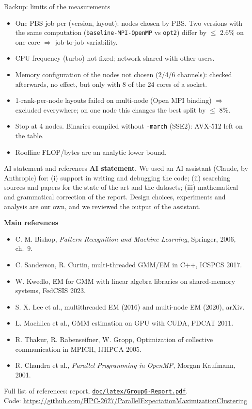 \documentclass[aspectratio=169,10pt]{beamer}
\newcommand{\vbase}{\texttt{baseline-MPI-OpenMP}}
\newcommand{\opttwo}{\texttt{opt2}}
\begin{document}
\begin{frame}{Backup: limits of the measurements}
\small
\begin{itemize}
\item One PBS job per (version, layout): nodes chosen by PBS. Two versions with the same computation (\vbase{} vs \opttwo{}) differ by $\le$ 2.6\% on one core $\Rightarrow$ job-to-job variability.
\item CPU frequency (turbo) not fixed; network shared with other users.
\item Memory configuration of the nodes not chosen (2/4/6 channels): checked afterwards, no effect, but only with 8 of the 24 cores of a socket.
\item 1-rank-per-node layouts failed on multi-node (Open MPI binding) $\Rightarrow$ excluded everywhere; on one node this changes the best split by $\le$ 8\%.
\item Stop at 4 nodes. Binaries compiled without \texttt{-march} (SSE2): AVX-512 left on the table.
\item Roofline FLOP/bytes are an analytic lower bound.
\end{itemize}
\end{frame}

\begin{frame}{AI statement and references}
\scriptsize
\textbf{AI statement.} We used an AI assistant (Claude, by Anthropic) for: (i) support in writing and debugging the code; (ii) searching sources and papers for the state of the art and the datasets; (iii) mathematical and grammatical correction of the report. Design choices, experiments and analysis are our own, and we reviewed the output of the assistant.

\medskip
\textbf{Main references}
\begin{itemize}
\item C. M. Bishop, \emph{Pattern Recognition and Machine Learning}, Springer, 2006, ch.~9.
\item C. Sanderson, R. Curtin, multi-threaded GMM/EM in C++, ICSPCS 2017.
\item W. Kwedlo, EM for GMM with linear algebra libraries on shared-memory systems, FedCSIS 2023.
\item S. X. Lee et al., multithreaded EM (2016) and multi-node EM (2020), arXiv.
\item L. Machlica et al., GMM estimation on GPU with CUDA, PDCAT 2011.
\item R. Thakur, R. Rabenseifner, W. Gropp, Optimization of collective communication in MPICH, IJHPCA 2005.
\item R. Chandra et al., \emph{Parallel Programming in OpenMP}, Morgan Kaufmann, 2001.
\end{itemize}
Full list of references: report, \href{https://github.com/HPC-2627/ParallelExpectationMaximizationClustering/blob/main/doc/latex/Group6-Report.pdf}{\texttt{doc/latex/Group6-Report.pdf}}.\\
Code: \url{https://github.com/HPC-2627/ParallelExpectationMaximizationClustering}
\end{frame}
\end{document}
